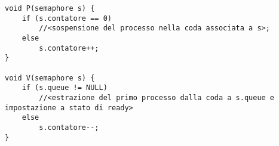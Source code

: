 \begin{verbatim}
void P(semaphore s) {
    if (s.contatore == 0)
        //<sospensione del processo nella coda associata a s>;
    else
        s.contatore++;
}

void V(semaphore s) {
    if (s.queue != NULL)
        //<estrazione del primo processo dalla coda a s.queue e impostazione a stato di ready>
    else
        s.contatore--;
}
\end{verbatim}



















































































